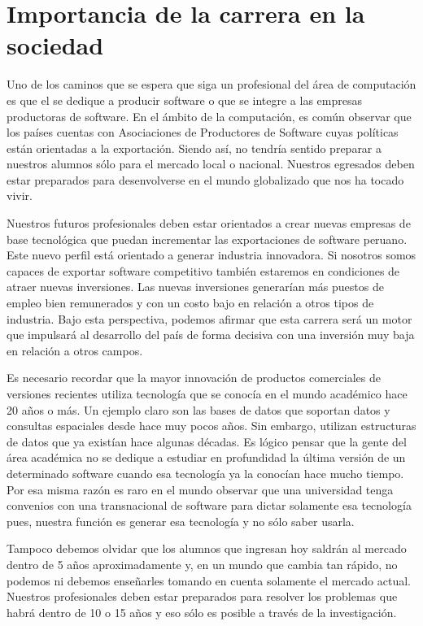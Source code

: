 \section{Importancia de la carrera en la sociedad}\label{sec:importance-in-the-society}

Uno de los caminos que se espera que siga un profesional del área de computación es 
que el se dedique a producir software o que se integre a las empresas productoras 
de software. En el ámbito de la computación, es común observar que los países 
cuentas con Asociaciones de Productores de Software cuyas políticas están 
orientadas a la exportación. Siendo así, no tendría sentido preparar a nuestros 
alumnos sólo para el mercado local o nacional. Nuestros egresados deben estar 
preparados para desenvolverse en el mundo globalizado que nos ha tocado vivir.

Nuestros futuros profesionales deben estar orientados a crear nuevas empresas 
de base tecnológica que puedan incrementar las exportaciones de software peruano. 
Este nuevo perfil está orientado a generar industria innovadora. Si nosotros somos 
capaces de exportar software competitivo también estaremos en condiciones de 
atraer nuevas inversiones. Las nuevas inversiones generarían más puestos de 
empleo bien remunerados y con un costo bajo en relación a otros tipos de 
industria. Bajo esta perspectiva, podemos afirmar que esta carrera será un 
motor que impulsará al desarrollo del país de forma decisiva con una inversión 
muy baja en relación a otros campos.

Es necesario recordar que la mayor innovación de productos comerciales de versiones 
recientes utiliza tecnología que se conocía en el mundo académico hace 20 años o más. 
Un ejemplo claro son las bases de datos que soportan datos y consultas espaciales 
desde hace muy pocos años. Sin embargo, utilizan estructuras de datos que ya 
existían hace algunas décadas. Es lógico pensar que la gente del área académica 
no se dedique a estudiar en profundidad la última versión de un determinado 
software cuando esa tecnología ya la conocían hace mucho tiempo. Por esa misma 
razón es raro en el mundo observar que una universidad tenga convenios con una 
transnacional de software para dictar solamente esa tecnología pues, nuestra 
función es generar esa tecnología y no sólo saber usarla.

Tampoco debemos olvidar que los alumnos que ingresan hoy saldrán al mercado 
dentro de 5 años aproximadamente y, en un mundo que cambia tan rápido, no podemos 
ni debemos enseñarles tomando en cuenta solamente el mercado actual. 
Nuestros profesionales deben estar preparados para resolver los problemas 
que habrá dentro de 10 o 15 años y eso sólo es posible a través de la 
investigación.